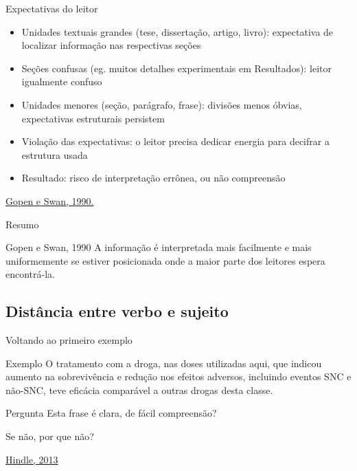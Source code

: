 \documentclass{beamer}
\begin{document}
\begin{frame}{Expectativas do leitor}
  \begin{itemize}
    \footnotesize
  \item<1-> Unidades textuais grandes (tese, dissertação, artigo, livro):
    \alert<-2>{expectativa} de localizar informação nas respectivas
    seções
    \medskip
  \item<2-> Seções confusas (eg. muitos detalhes experimentais em
    Resultados): leitor igualmente confuso
    \medskip
  \item<3-> Unidades menores (seção, parágrafo, frase): divisões menos
    óbvias, \alert<3>{expectativas estruturais persistem}
    \medskip
  \item<4-> Violação das expectativas: o \alert{leitor precisa dedicar
      energia} para decifrar a estrutura usada
    \medskip
  \item<5-> Resultado: risco de interpretação errônea, ou não compreensão
  \end{itemize}

  \vfill
  \scriptsize
  \hfill \href{https://www.georgegopen.com/uploads/1/0/9/0/109073507/gopen___swan_sci_of_sci_writing_am_sci_1990_.pdf}{Gopen e Swan, 1990.}
\end{frame}

\begin{frame}{Resumo}
  \begin{block}{Gopen e Swan, 1990}
    A informação é interpretada mais facilmente e mais uniformemente
    se estiver posicionada onde a maior parte dos leitores espera
    encontrá-la.
  \end{block}
\end{frame}

\subsection{Distância entre verbo e sujeito}

\begin{frame}{Voltando ao primeiro exemplo}
  \begin{exampleblock}{Exemplo}
    \footnotesize
    O \alert<2>{tratamento com a droga}, nas doses utilizadas aqui, que
    indicou aumento na sobrevivência e redução nos efeitos adversos,
    incluindo eventos SNC e não-SNC, \alert<2>{teve} eficácia
    comparável a outras drogas desta classe.
  \end{exampleblock}

  \begin{block}{Pergunta}
    \scriptsize
    Esta frase é clara, de fácil compreensão?

    \bigskip
    Se não, por que não?
  \end{block}

  \vfill
  \scriptsize
  \hfill \href{https://web.archive.org/web/20150512001938/http://www.edanzediting.com/blog/reader_expectations_subject_verb_placement}
  {Hindle, 2013}
\end{frame}
\end{document}

